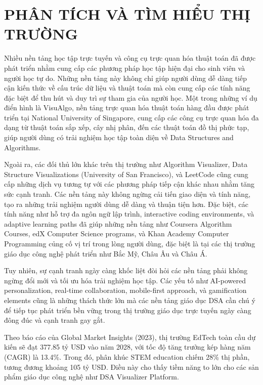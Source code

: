 \chapter{PHÂN TÍCH VÀ TÌM HIỂU THỊ TRƯỜNG}
\label{ch:market-analysis}

Nhiều nền tảng học tập trực tuyến và công cụ trực quan hóa thuật toán đã được phát triển nhằm cung cấp các phương pháp học tập hiện đại cho sinh viên và người học tự do. Những nền tảng này không chỉ giúp người dùng dễ dàng tiếp cận kiến thức về cấu trúc dữ liệu và thuật toán mà còn cung cấp các tính năng đặc biệt để thu hút và duy trì sự tham gia của người học. Một trong những ví dụ điển hình là VisuAlgo, nền tảng trực quan hóa thuật toán hàng đầu được phát triển tại National University of Singapore, cung cấp các công cụ trực quan hóa đa dạng từ thuật toán sắp xếp, cây nhị phân, đến các thuật toán đồ thị phức tạp, giúp người dùng có trải nghiệm học tập toàn diện về Data Structures and Algorithms.

Ngoài ra, các đối thủ lớn khác trên thị trường như Algorithm Visualizer, Data Structure Visualizations (University of San Francisco), và LeetCode cũng cung cấp những dịch vụ tương tự với các phương pháp tiếp cận khác nhau nhằm tăng sức cạnh tranh. Các nền tảng này không ngừng cải tiến giao diện và tính năng, tạo ra những trải nghiệm người dùng dễ dàng và thuận tiện hơn. Đặc biệt, các tính năng như hỗ trợ đa ngôn ngữ lập trình, interactive coding environments, và adaptive learning paths đã giúp những nền tảng như Coursera Algorithm Courses, edX Computer Science programs, và Khan Academy Computer Programming củng cố vị trí trong lòng người dùng, đặc biệt là tại các thị trường giáo dục công nghệ phát triển như Bắc Mỹ, Châu Âu và Châu Á.

Tuy nhiên, sự cạnh tranh ngày càng khốc liệt đòi hỏi các nền tảng phải không ngừng đổi mới và tối ưu hóa trải nghiệm học tập. Các yếu tố như AI-powered personalization, real-time collaboration, mobile-first approach, và gamification elements cũng là những thách thức lớn mà các nền tảng giáo dục DSA cần chú ý để tiếp tục phát triển bền vững trong thị trường giáo dục trực tuyến ngày càng đông đúc và cạnh tranh gay gắt.

Theo báo cáo của Global Market Insights (2023), thị trường EdTech toàn cầu dự kiến sẽ đạt 377.85 tỷ USD vào năm 2028, với tốc độ tăng trưởng kép hàng năm (CAGR) là 13.4\%. Trong đó, phân khúc STEM education chiếm 28\% thị phần, tương đương khoảng 105 tỷ USD. Điều này cho thấy tiềm năng to lớn cho các sản phẩm giáo dục công nghệ như DSA Visualizer Platform.


